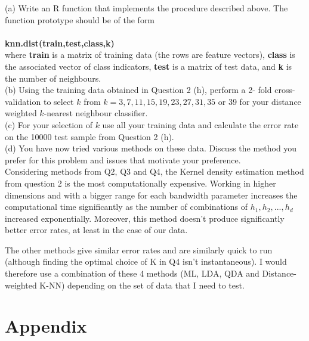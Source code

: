 \documentclass{article}
\begin{document}
(a) Write an R function that implements the procedure described above. The function prototype should be of the form\\ \\
\textbf{knn.dist(train,test,class,k)} \\

where \textbf{train} is a matrix of training data (the rows are feature vectors), \textbf{class} is the associated vector of class indicators, \textbf{test} is a matrix of test data, and \textbf{k} is the number of neighbours.\\

(b) Using the training data obtained in Question 2 (h), perform a 2- fold cross-validation to select $k$ from $k = 3, 7, 11, 15, 19, 23, 27, 31, 35$ or 39 for your distance weighted $k$-nearest neighbour classifier.\\

(c) For your selection of $k$ use all your training data and calculate the error rate on the 10000 test sample from Question 2 (h).\\



(d) You have now tried various methods on these data. Discuss the method you prefer for this problem and issues that motivate your preference. \\

Considering methods from Q2, Q3 and Q4, the Kernel density estimation method from question 2 is the most computationally expensive. Working in higher dimensions and with a bigger range for each bandwidth parameter increases the computational time significantly as the number of combinations of $h_1,h_2,...,h_d$ increased exponentially. Moreover, this method doesn't produce significantly better error rates, at least in the case of our data. 

The other methods give similar error rates and are similarly quick to run (although finding the optimal choice of K in Q4 isn't instantaneous). I would therefore use a combination of these 4 methods (ML, LDA, QDA and Distance-weighted K-NN) depending on the set of data that I need to test.


\newpage
\section{Appendix}
\lstset{
basicstyle=\small\ttfamily,
columns=flexible,
breaklines=true
}
\begin{lstlisting}



\end{lstlisting}

%

%

\end{document}
